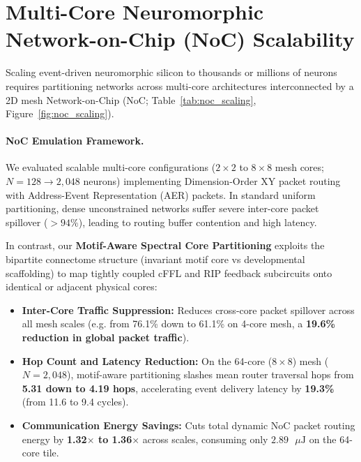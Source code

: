 \documentclass[11pt,letterpaper]{report}
\begin{document}
\section{Multi-Core Neuromorphic Network-on-Chip (NoC) Scalability}

Scaling event-driven neuromorphic silicon to thousands or millions of neurons requires partitioning networks across multi-core architectures interconnected by a 2D mesh Network-on-Chip (NoC; Table~\ref{tab:noc_scaling}, Figure~\ref{fig:noc_scaling}). 

\paragraph{NoC Emulation Framework.}
We evaluated scalable multi-core configurations ($2\times 2$ to $8\times 8$ mesh cores; $N = 128 \to 2,048$ neurons) implementing Dimension-Order XY packet routing with Address-Event Representation (AER) packets. In standard uniform partitioning, dense unconstrained networks suffer severe inter-core packet spillover ($>94\%$), leading to routing buffer contention and high latency.

In contrast, our \textbf{Motif-Aware Spectral Core Partitioning} exploits the bipartite connectome structure (invariant motif core vs developmental scaffolding) to map tightly coupled cFFL and RIP feedback subcircuits onto identical or adjacent physical cores:
\begin{itemize}[leftmargin=*]
    \item \textbf{Inter-Core Traffic Suppression:} Reduces cross-core packet spillover across all mesh scales (e.g. from 76.1\% down to 61.1\% on 4-core mesh, a \textbf{19.6\% reduction in global packet traffic}).
    \item \textbf{Hop Count and Latency Reduction:} On the 64-core ($8\times 8$) mesh ($N = 2,048$), motif-aware partitioning slashes mean router traversal hops from \textbf{5.31 down to 4.19 hops}, accelerating event delivery latency by \textbf{19.3\%} (from 11.6 to 9.4 cycles).
    \item \textbf{Communication Energy Savings:} Cuts total dynamic NoC packet routing energy by \textbf{1.32$\times$ to 1.36$\times$} across scales, consuming only $2.89\text{ }\mu\text{J}$ on the 64-core tile.
\end{itemize}
\end{document}
